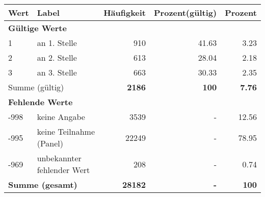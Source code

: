      \begin{longtable}{lXrrr}
     \toprule
     \textbf{Wert} & \textbf{Label} & \textbf{Häufigkeit} & \textbf{Prozent(gültig)} & \textbf{Prozent} \\
     \endhead
     \midrule
     \multicolumn{5}{l}{\textbf{Gültige Werte}}\\

     1 &
     \multicolumn{1}{X}{ an 1. Stelle   } &


       \num{910} &
       \num[round-mode=places,round-precision=2]{41,63} &
         \num[round-mode=places,round-precision=2]{3,23} \\

     2 &
     \multicolumn{1}{X}{ an 2. Stelle   } &


       \num{613} &
       \num[round-mode=places,round-precision=2]{28,04} &
         \num[round-mode=places,round-precision=2]{2,18} \\

     3 &
     \multicolumn{1}{X}{ an 3. Stelle   } &


       \num{663} &
       \num[round-mode=places,round-precision=2]{30,33} &
         \num[round-mode=places,round-precision=2]{2,35} \\
     \midrule
     \multicolumn{2}{l}{Summe (gültig)} &
       \textbf{\num{2186}} &
     \textbf{100} &
       \textbf{\num[round-mode=places,round-precision=2]{7,76}} \\
     \multicolumn{5}{l}{\textbf{Fehlende Werte}}\\
       -998 &
       keine Angabe &
         \num{3539} &
        - &
         \num[round-mode=places,round-precision=2]{12,56} \\
       -995 &
       keine Teilnahme (Panel) &
         \num{22249} &
        - &
         \num[round-mode=places,round-precision=2]{78,95} \\
       -969 &
       unbekannter fehlender Wert &
         \num{208} &
        - &
         \num[round-mode=places,round-precision=2]{0,74} \\
     \midrule
     \multicolumn{2}{l}{\textbf{Summe (gesamt)}} &
          \textbf{\num{28182}} &
        \textbf{-} &
        \textbf{100} \\
     \bottomrule
     \end{longtable}
     
